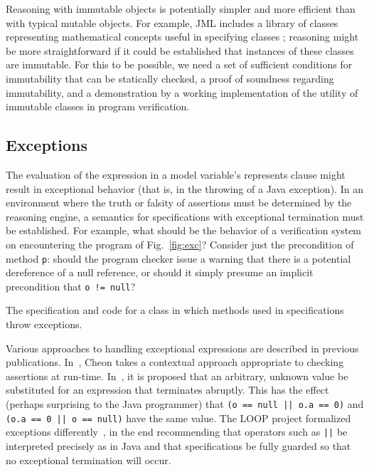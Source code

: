 \documentclass{sig-alternate}
\begin{document}
Reasoning with immutable objects is potentially simpler and more efficient than with typical
mutable objects.  For example, JML includes a library of classes representing mathematical 
concepts useful in specifying classes \cite{Leavens-etal03a}; 
reasoning might be more straightforward if it could be 
established that instances of these classes are immutable.  For this to be possible, we need 
a set of sufficient conditions for immutability that can be statically checked, a proof of 
soundness regarding immutability, and a demonstration by a working implementation
of the utility of immutable classes in program verification.


\subsection{Exceptions}

The evaluation of the expression in a model variable's represents
clause might result in exceptional behavior (that is, in the throwing
of a Java exception).  In an environment where the truth or falsity of
assertions must be determined by the reasoning engine, a semantics for
specifications with exceptional termination must be established.  For
example, what should be the behavior of a verification system on
encountering the program of Fig.~\ref{fig:exc}?  Consider just the
precondition of method \texttt{p}: should the program checker issue a
warning that there is a potential dereference of a null reference, or
should it simply presume an implicit precondition that \texttt{o !=
  null}?

\begin{BFIGURE}

\caption{The specification and code for a class in which methods used in specifications throw exceptions.}
\label{fig:exc}
\end{BFIGURE}

Various approaches to handling exceptional expressions are described
in previous publications.  In~\cite{Cheon-Leavens02b}, Cheon takes a
contextual approach appropriate to checking assertions at run-time.
In~\cite{Leavens-Baker-Ruby02}, it is proposed that an arbitrary,
unknown value be substituted for an expression that terminates
abruptly.  This has the effect (perhaps surprising to the Java
programmer) that \texttt{(o == null || o.a == 0)} and \texttt{(o.a ==
  0 || o == null)} have the same value.  The LOOP project formalized
exceptions differently~\cite{BergPJ00a}, in the end recommending that
operators such as \texttt{||} be interpreted precisely as in Java and
that specifications be fully guarded so that no exceptional
termination will occur.
\end{document}
